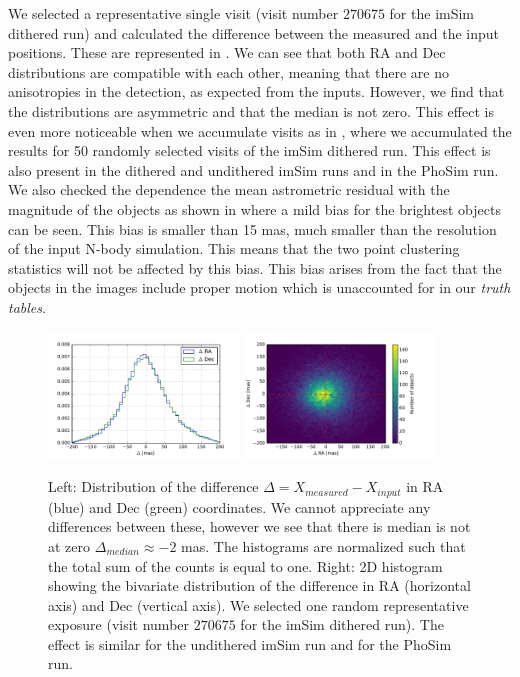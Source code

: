 \documentclass[\docopts]{\docclass}
\begin{document}
We selected a representative single visit (visit number $270675$ for the imSim dithered run) and calculated the difference between the measured and the input positions. These are represented in . We can see that both RA and Dec distributions are compatible with each other, meaning that there are no anisotropies in the detection, as expected from the inputs.
However, we find that the distributions are asymmetric and that the median is not zero. This effect is even more noticeable when we accumulate visits as in , where we accumulated the results for 50 randomly selected visits of the imSim dithered run. This effect is also present in the dithered and undithered imSim runs and in the PhoSim run. We also checked the dependence the mean astrometric residual with the magnitude of the objects as shown in  where a mild bias for the brightest objects can be seen. This bias is smaller than 15 mas, much smaller than the resolution of the input N-body simulation. This means that the two point clustering statistics will not be affected by this bias. This bias arises from the fact that the objects in the images include proper motion which is unaccounted for in our \textit{truth tables}.

\begin{figure}
  \centering
  \includegraphics[width=0.45\textwidth]{astrometry_single_visit_imsim_dithered_hist}
  \includegraphics[width=0.45\textwidth]{astrometry_single_visit_imsim_dithered_hist2d}
  \caption{Left: Distribution of the difference $\Delta=X_{measured}-X_{input}$ in RA (blue) and Dec (green) coordinates. We cannot
  appreciate any differences between these, however we see that there is median is not at zero $\Delta_{median} \approx -2$ mas.
  The histograms are normalized such that the total sum of the counts is equal to one. Right: 2D histogram
  showing the bivariate distribution of the difference in RA (horizontal axis) and Dec (vertical axis). We selected one random representative
  exposure (visit number $270675$ for the imSim dithered run). The effect is similar for the undithered imSim run and for the PhoSim run.}
  \label{fig:astrometry_a}
\end{figure}
\end{document}
